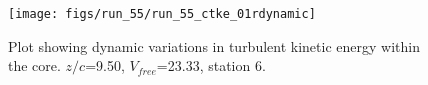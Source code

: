 \begin{figure}[H]
\centering
\texttt{[image: figs/run\_55/run\_55\_ctke\_01rdynamic]}
\caption{Plot showing dynamic variations in turbulent kinetic energy within the core. $z/c$=9.50, $V_{free}$=23.33, station 6.}
\label{fig:run_55_ctke_01rdynamic}
\end{figure}


